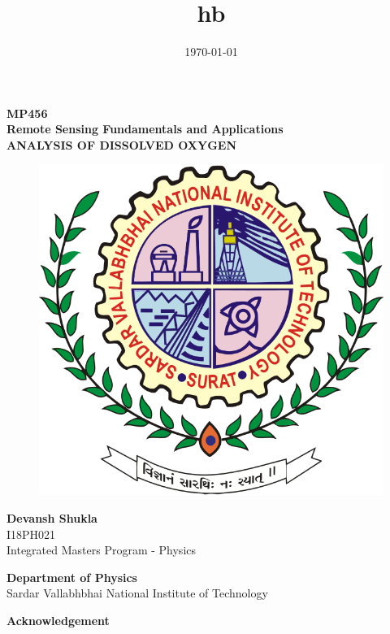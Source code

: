 \documentclass[12pt]{report}
\title{hb}
\date{\today}
\newcommand{\pagetitle}[1]{
    \begin{center}
        \textbf{{\LARGE#1}}
    \end{center}
}
\begin{document}
    \nocite{*}
    \begin{titlepage}
        \begin{center}
            {\LARGE\textbf{MP456}} \\[10pt]
            {\LARGE\textbf{Remote Sensing Fundamentals and Applications}} \\[50pt]
            {\LARGE\textbf{ANALYSIS OF DISSOLVED OXYGEN}} \\[50pt]

            \begin{figure}[H]
                \centering
                \includegraphics[scale=0.25]{figs/SVNIT_Surat_Logo.png}
            \end{figure}
            \vspace*{2cm}
            {\large\textbf{Devansh Shukla} \\[5pt]
            I18PH021} \\
            Integrated Masters Program - Physics
            
            \vspace*{2cm}
            {\textbf{Department of Physics}} \\[10pt]
            {Sardar Vallabhbhai National Institute of Technology}

        \end{center}
    \end{titlepage}
    \newpage
    \pagetitle{Acknowledgement}
\end{document}
